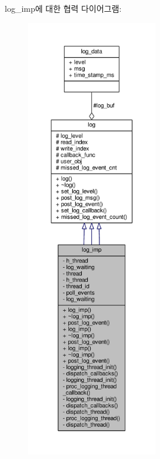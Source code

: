 log\+\_\+imp에 대한 협력 다이어그램\+:
\nopagebreak
\begin{figure}[H]
\begin{center}
\leavevmode
\includegraphics[height=550pt]{classavdecc__lib_1_1log__imp__coll__graph}
\end{center}
\end{figure}
